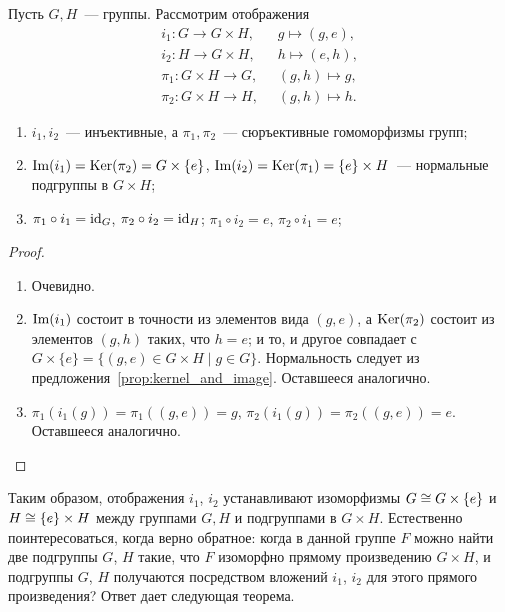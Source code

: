 \begin{proposition}\label{prop:direct_product_properties}
Пусть $G,H$~--- группы.
Рассмотрим отображения
\begin{align*}
i_1\colon G\to G\times H,&\;\; g\mapsto (g,e),\\
i_2\colon H\to G\times H,&\;\; h\mapsto (e,h),\\
\pi_1\colon G\times H\to G,&\;\; (g,h)\mapsto g,\\
\pi_2\colon G\times H\to H,&\;\; (g,h)\mapsto h.
\end{align*}
\begin{enumerate}
\item $i_1,i_2$~--- инъективные, а $\pi_1,\pi_2$~--- сюръективные
  гомоморфизмы групп;
\item\label{item:direct_product_2}
  $\operatorname{Im}(i_1)=\operatorname{Ker}(\pi_2)=G\times\{e\}$,
  $\operatorname{Im}(i_2)=\operatorname{Ker}(\pi_1)=\{e\}\times H$~--- нормальные подгруппы в
  $G\times H$;
\item $\pi_1\circ i_1 = \operatorname{id}_G$, $\pi_2\circ i_2 = \operatorname{id}_H$;
  $\pi_1\circ i_2 = e$, $\pi_2\circ i_1 = e$;
\end{enumerate}
\end{proposition}
\begin{proof}
\begin{enumerate}
\item Очевидно.
\item $\operatorname{Im}(i_1)$ состоит в точности из элементов вида $(g,e)$, а
  $\operatorname{Ker}(\pi_2)$ состоит из элементов $(g,h)$ таких, что $h=e$; и то, и
  другое совпадает с $G\times\{e\} = \{(g,e)\in G\times H\mid g\in
  G\}$. Нормальность следует из
  предложения~\ref{prop:kernel_and_image}. Оставшееся аналогично.
\item $\pi_1(i_1(g)) = \pi_1((g,e)) = g$, $\pi_2(i_1(g)) =
  \pi_2((g,e)) = e$. Оставшееся аналогично.
\end{enumerate}
\end{proof}

Таким образом, отображения $i_1$, $i_2$ устанавливают изоморфизмы
$G\cong G\times\{e\}$ и $H\cong \{e\}\times H$ между группами $G,H$ и
подгруппами в $G\times H$. Естественно поинтересоваться, когда верно
обратное: когда в данной группе $F$ можно найти две подгруппы $G$,
$H$ такие, что $F$ изоморфно прямому произведению $G\times H$, и
подгруппы $G$, $H$ получаются посредством вложений $i_1$, $i_2$ для
этого прямого произведения? Ответ дает следующая теорема.

